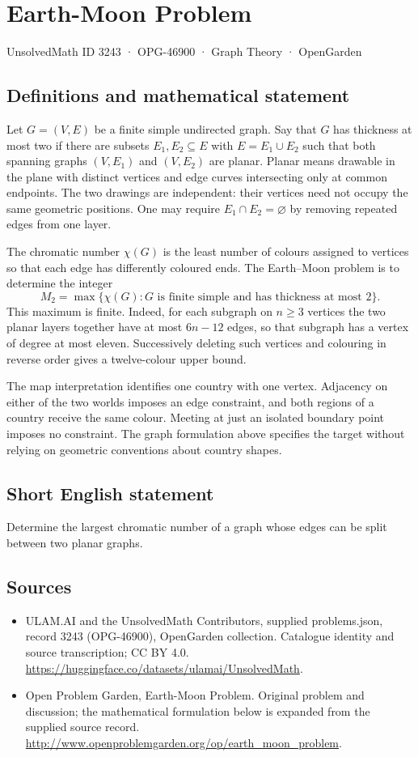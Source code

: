 \documentclass[11pt,a4paper]{article}
\begin{document}
\section*{Earth-Moon Problem}\label{3243}
{\small UnsolvedMath ID 3243 · OPG-46900 · Graph Theory · OpenGarden}
\subsection{Definitions and mathematical statement}
Let $G=(V,E)$ be a finite simple undirected graph. Say that $G$ has thickness
at most two if there are subsets $E_1,E_2\subseteq E$ with
$E=E_1\cup E_2$ such that both spanning graphs $(V,E_1)$ and $(V,E_2)$ are
planar. Planar means drawable in the plane with distinct vertices and
edge curves intersecting only at common endpoints. The two drawings are
independent: their vertices need not occupy the same geometric positions.
One may require $E_1\cap E_2=\varnothing$ by removing repeated edges from
one layer.

The chromatic number $\chi(G)$ is the least number of colours assigned to
vertices so that each edge has differently coloured ends. The Earth--Moon
problem is to determine the integer
\[
 M_2=\max\{\chi(G):G\text{ is finite simple and has thickness at most }2\}.
\]
This maximum is finite. Indeed, for each subgraph on $n\ge3$ vertices the
two planar layers together have at most $6n-12$ edges, so that subgraph has
a vertex of degree at most eleven. Successively deleting such vertices
and colouring in reverse order gives a twelve-colour upper bound.

The map interpretation identifies one country with one vertex. Adjacency
on either of the two worlds imposes an edge constraint, and both regions
of a country receive the same colour. Meeting at just an isolated boundary
point imposes no constraint. The graph formulation above specifies the
target without relying on geometric conventions about country shapes.
\subsection{Short English statement}
Determine the largest chromatic number of a graph whose edges can be split between two planar graphs.
\subsection{Sources}
\begin{itemize}
\item[S1] ULAM.AI and the UnsolvedMath Contributors, supplied problems.json, record 3243 (OPG-46900), OpenGarden collection. Catalogue identity and source transcription; CC BY 4.0.
\url{https://huggingface.co/datasets/ulamai/UnsolvedMath}.
\item[S2] Open Problem Garden, Earth-Moon Problem. Original problem and discussion; the mathematical formulation below is expanded from the supplied source record.
\url{http://www.openproblemgarden.org/op/earth_moon_problem}.
\end{itemize}
\end{document}
